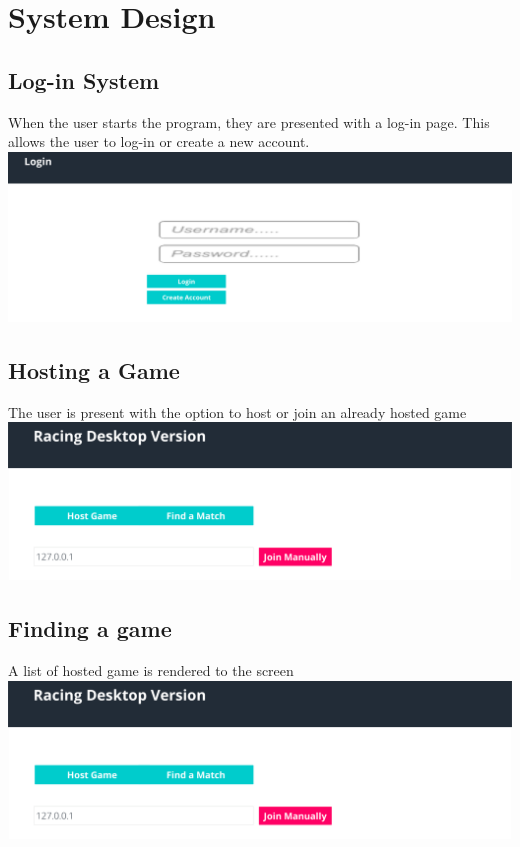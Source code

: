 
\chapter{System Design}

\section{Log-in System}
When the user starts the program, they are presented with a log-in page. This allows the user to log-in or create a new account.
\newline
\includegraphics[width=1\columnwidth]{img/LoginActual.PNG}

\section{Hosting a Game}
The user is present with the option to host or join an already hosted game
\newline
\includegraphics[width=1\columnwidth]{img/MatchFinder1Actual.PNG}

\section{Finding a game}
A list of hosted game is rendered to the screen
\newline
\includegraphics[width=1\columnwidth]{img/MatchFinder1Actual.PNG}

